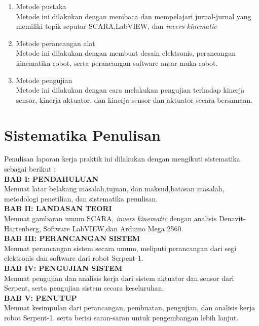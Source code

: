 \begin{enumerate}
	\item Metode pustaka\\
	Metode ini dilakukan dengan membaca dan mempelajari jurnal-jurnal yang memiliki topik seputar SCARA,LabVIEW, dan \textit{invers kinematic}
	
	\item Metode perancangan alat\\
	Metode ini dilakukan dengan membuat desain elektronis, perancangan kinematika robot, serta perancangan software antar muka robot.
	
	\item Metode pengujian\\
	Metode ini dilakukan dengan cara melakukan pengujian terhadap kinerja sensor, kinerja aktuator, dan kinerja sensor dan aktuator secara bersamaan.
	
\end{enumerate}

\section{Sistematika Penulisan}
Penulisan laporan kerja praktik ini dilakukan dengan mengikuti sistematika sebagai berikut :\\
\noindent
\textbf{BAB I\hspace*{0.6cm}: PENDAHULUAN}\\
\noindent
Memuat latar belakang masalah,tujuan, dan maksud,batasan masalah, metodologi penetilian, dan sistematika penulisan.\\
\noindent
\textbf{BAB II\hspace*{0.5cm}: LANDASAN TEORI}\\
\noindent
Memuat gambaran umum SCARA, \textit{invers kinematic} dengan analisis Denavit-Hartenberg, Software LabVIEW,dan Arduino Mega 2560.\\
\textbf{BAB III\hspace*{0.375cm}:  PERANCANGAN SISTEM}\\
\noindent
Memuat perancangan sistem secara umum, meliputi perancangan dari segi elektronis dan software dari robot Serpent-1.\\
\textbf{BAB IV\hspace*{0.4cm}: PENGUJIAN SISTEM}\\
\noindent
Memuat pengujian dan analisis kerja dari sistem aktuator dan sensor dari Serpent, serta pengujian sistem secara keseluruhan.\\
\textbf{BAB V\hspace*{0.6cm}: PENUTUP}\\
Memuat kesimpulan dari perancangan, pembuatan, pengujian, dan analisis kerja robot Serpent-1, serta berisi saran-saran untuk pengembangan lebih lanjut.\\